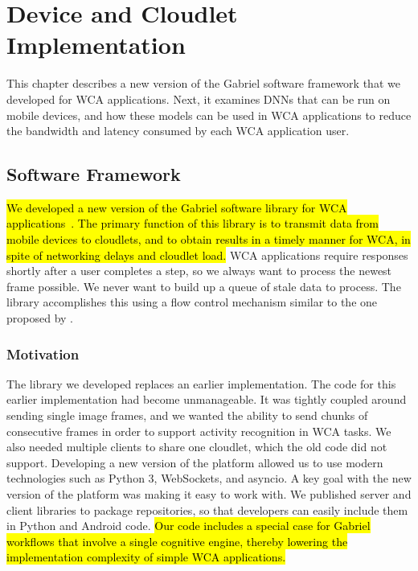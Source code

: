 \chapter{Device and Cloudlet Implementation}\label{chap:implementation}

This chapter describes a new version of the Gabriel software framework that we
developed for WCA applications.
Next, it examines DNNs that can be run on mobile devices, and how
these models can be used in WCA applications to reduce the bandwidth and
latency consumed by each WCA application user.

\section{Software Framework}

\hl{
  We developed a new version of the Gabriel software library for WCA
  applications~{\cite{gabriel_github}}.
  The primary function of this library is to transmit data from mobile
  devices to cloudlets, and to obtain results in a timely manner for WCA, in
  spite of networking delays and cloudlet load.
}
WCA applications require responses shortly after a user completes a step, so
we always want to process the newest frame possible. We never want to build up
a queue of stale data to process. The library accomplishes this using a flow
control mechanism similar to the one proposed by \citet{ha2014}.

\subsection{Motivation}

The library we developed replaces an earlier implementation.
The code for this earlier implementation had become unmanageable.
It was tightly coupled around sending single image frames, and we
wanted the ability to send chunks of consecutive frames in order to support
activity recognition in WCA tasks.
We also needed multiple clients to share one cloudlet, which the old code did
not support.
Developing a new version of the platform allowed us to use modern technologies
such as Python 3, WebSockets, and asyncio.
A key goal with the new version of the platform was making it easy to work with.
We published server and client libraries to package repositories, so that
developers can easily include them in Python and Android code.
\hl{
Our code includes a special case for Gabriel workflows that involve a single
cognitive engine, thereby lowering the implementation complexity of simple WCA
applications.
}

